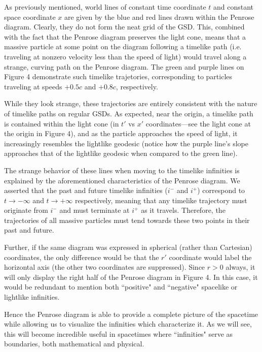 \documentclass{article}
\begin{document}
As previously mentioned, world lines of constant time coordinate $t$ and constant space coordinate $x$ are given by the blue and red lines drawn within the Penrose diagram. Clearly, they do not form the neat grid of the GSD. This, combined with the fact that the Penrose diagram preserves the light cone, means that a massive particle at some point on the diagram following a timelike path (i.e. traveling at nonzero velocity less than the speed of light) would travel along a strange, curving path on the Penrose diagram. The green and purple lines on Figure 4 demonstrate such timelike trajetories, corresponding to particles traveling at speeds $+0.5c$ and $+0.8c$, respectively.

While they look strange, these trajectories are entirely consistent with the nature of timelike paths on regular GSDs. As expected, near the origin, a timelike path is contained within the light cone (in $t'$ vs $x'$ coordinates---see the light cone at the origin in Figure 4), and as the particle approaches the speed of light, it increasingly resembles the lightlike geodesic (notice how the purple line's slope approaches that of the lightlike geodesic when compared to the green line). 

The strange behavior of these lines when moving to the timelike infinities is explained by the aforementioned characteristics of the Penrose diagram. We asserted that the past and future timelike infinities ($i^-$ and $i^+$) correspond to $t\rightarrow-\infty$ and $t\rightarrow+\infty$ respectively, meaning that any timelike trajectory must originate from $i^-$ and must terminate at $i^+$ as it travels. Therefore, the trajectories of all massive particles must tend towards these two points in their past and future.

Further, if the same diagram was expressed in spherical (rather than Cartesian) coordinates, the only difference would be that the $r'$ coordinate would label the horizontal axis (the other two coordinates are suppressed). Since $r>0$ always, it will only display the right half of the Penrose diagram in Figure 4. In this case, it would be redundant to mention both ``positive" and ``negative" spacelike or lightlike infinities.

Hence the Penrose diagram is able to provide a complete picture of the spacetime while allowing us to visualize the infinities which characterize it. As we will see, this will become incredible useful in spacetimes where ``infinities" serve as boundaries, both mathematical and physical.
\end{document}
